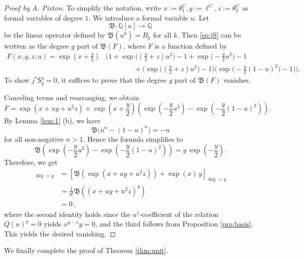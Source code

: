 \documentclass[11pt]{article}
\def\QQ{\mathbb{Q}}
\newcommand{\sfS}{\mathsf{S}}
\newcommand{\fB}{\mathfrak{B}}
\theoremstyle{definition}
\begin{document}
\begin{proof}[Proof by A. Pixton]
    To simplify the notation, write $x:= \theta_1^C, y := \ell^C,z := \theta_2^C$ as formal variables of degree $1$. We introduce a formal variable $u$. Let
    \begin{equation}\label{eq:Boperator}
        \fB \colon \QQ[u] \longrightarrow \QQ
    \end{equation}
    be the linear operator defined by $\fB(u^k)=B_k$ for all $k$. Then \eqref{eq:jS} can be written
    as the degree $g$ part of $\fB(F)$, where $F$ is a function defined by
    \begin{align*}
    F(x,y,z;u)
    =
    \exp\!\left(x+\frac{y}{2}\right)
    &\Bigg(
    1
    +
    \exp\!\big((\tfrac{y}{2}+z)u^2\big)-1
    +
    \exp\!\big(-\tfrac{y}{2}u^2\big)-1
    \\
    &\qquad\qquad
    +
    \big(\exp\!\big((\tfrac{y}{2}+z)u^2\big)-1\big)
    \big(\exp\!\big(-\tfrac{y}{2}(1-u)^2\big)-1\big)
    \Bigg).
    \end{align*}
    To show $j^*\sfS^g_g=0$, it suffices to prove that the degree $g$ part of $\fB(F)$ vanishes.


    Canceling terms and rearranging, we obtain
    \[
    F
    =
    \exp(x+uy+u^2z)
    +
    \exp\!\left(x+\frac{y}{2}\right)
    \left(
    \exp\!\left(-\frac{y}{2}u^2\right)
    -
    \exp\!\left(-\frac{y}{2}(1-u)^2\right)
    \right).
    \]
    By Lemma \ref{lem:1} (b), we have
    \[
    \fB\big(u^n-(1-u)^n\big)= -n
    \]
    for all non-negative $n>1$. Hence the formula simplifies to
    \[
    \fB\!\left(
    \exp\!\left(-\frac{y}{2}u^2\right)
    -
    \exp\!\left(-\frac{y}{2}(1-u)^2\right)
    \right)
    =
    y\,\exp\!\left(-\frac{y}{2}\right).
    \]
    Therefore, we get
    \begin{align*}
		[\fB(F)]_{\deg = g}
        &=
        \left[\fB\!\left(\exp(x+uy+u^2z)\right)
        +
        \exp(x)\,y\right]_{\deg = g}\\
        &=\frac{1}{g!}\fB\!\left((x+uy+u^2z)^g\right)\\
        &=0\,,
    \end{align*}
    where the second identity holds since the $u^1$-coefficient of the relation $Q(u)^g=0$ yields $x^{g-1}y=0$, and the third follows from Proposition \ref{pro:basis}. This yields the desired vanishing.
\end{proof}

We finally complete the proof of Theorem \ref{thm:unit}.
\end{document}
